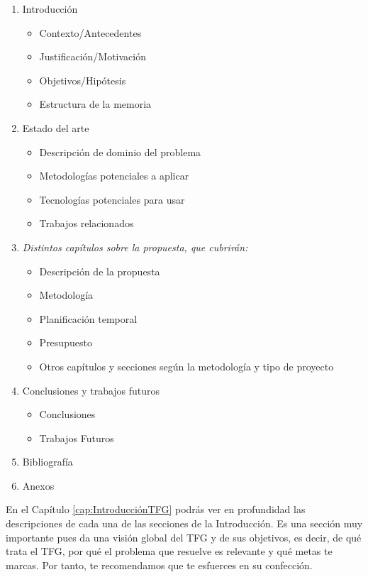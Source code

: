 \begin{enumerate}
    \item Introducción
        \begin{itemize}
            \item Contexto/Antecedentes
            \item Justificación/Motivación
            \item Objetivos/Hipótesis
            \item Estructura de la memoria
        \end{itemize}
    \item Estado del arte
        \begin{itemize}
            \item Descripción de dominio del problema
            \item Metodologías potenciales a aplicar
            \item Tecnologías potenciales para usar
            \item Trabajos relacionados
        \end{itemize}
    \item \textit{Distintos capítulos sobre la propuesta, que cubrirán:}
    \begin{itemize}
            \item Descripción de la propuesta
            \item Metodología
            \item Planificación temporal
            \item Presupuesto
            \item Otros capítulos y secciones según la metodología y tipo de proyecto
        \end{itemize}
    \item Conclusiones y trabajos futuros
    \begin{itemize}
            \item Conclusiones
            \item Trabajos Futuros
        \end{itemize}
    \item Bibliografía
    \item Anexos
\end{enumerate}

En el Capítulo \ref{cap:IntroducciónTFG} podrás ver en profundidad las descripciones de cada una de las secciones de la Introducción. Es una sección muy importante pues da una visión global del TFG y de sus objetivos, es decir, de qué trata el TFG, por qué el problema que resuelve es relevante y qué metas te marcas. Por tanto, te recomendamos que te esfuerces en su confección. 

